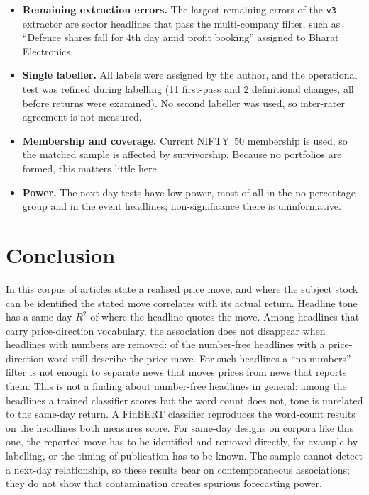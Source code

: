 \documentclass[11pt]{article}
\begin{document}
\begin{itemize}
  \item \textbf{Remaining extraction errors.} The largest remaining errors of the \texttt{v3} extractor are sector headlines that pass the multi-company filter, such as ``Defence shares fall for 4th day amid profit booking'' assigned to Bharat Electronics.
  \item \textbf{Single labeller.} All labels were assigned by the author, and the operational test was refined during labelling (11 first-pass and 2 definitional changes, all before returns were examined). No second labeller was used, so inter-rater agreement is not measured.
  \item \textbf{Membership and coverage.} Current NIFTY~50 membership is used, so the matched sample is affected by survivorship. Because no portfolios are formed, this matters little here.
  \item \textbf{Power.} The next-day tests have low power, most of all in the no-percentage group and in the event headlines; non-significance there is uninformative.
\end{itemize}

\section{Conclusion}

In this corpus \flagVthree{} of articles state a realised price move, and where the subject stock can be identified the stated move correlates \corrVthree{} with its actual return. Headline tone has a same-day $R^2$ of \toneRsqVthree{} where the headline quotes the move. Among headlines that carry price-direction vocabulary, the association does not disappear when headlines with numbers are removed: \shareLabMove{} of the number-free headlines with a price-direction word still describe the price move. For such headlines a ``no numbers'' filter is not enough to separate news that moves prices from news that reports them. This is not a finding about number-free headlines in general: among the headlines a trained classifier scores but the word count does not, tone is unrelated to the same-day return. A FinBERT classifier reproduces the word-count results on the headlines both measures score. For same-day designs on corpora like this one, the reported move has to be identified and removed directly, for example by labelling, or the timing of publication has to be known. The sample cannot detect a next-day relationship, so these results bear on contemporaneous associations; they do not show that contamination creates spurious forecasting power.
\end{document}
